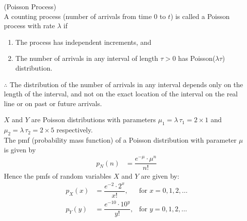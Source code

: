 \begin{definition}\label{poisson/3/poisson_process}
    (Poisson Process)\\
    A counting process (number of arrivals from time $0$ to $t$) is called a Poisson process with rate $\lambda$ if
    \begin{enumerate}[label=(\roman*)]
        \item The process has independent increments, and
        \item The number of arrivals in any interval of length $\tau > 0$ has Poisson($\lambda \tau$) distribution.
    \end{enumerate}
    $\therefore$ The distribution of the number of arrivals in any interval depends only on the length of the interval, and not on the exact location of the interval on the real line or on past or future arrivals.
    \end{definition}
    \begin{definition}
        $X$ and $Y$ are Poisson distributions with parameters $\mu_1 = \lambda \, \tau_1 = 2 \times 1$ and $\mu_2 = \lambda \, \tau_2 = 2 \times 5$ respectively. \\
        The pmf (probability mass function) of a Poisson distribution with parameter $\mu$ is given by
        \begin{align}
            p_N(n) &= \dfrac{e^{-\mu}\cdot \mu^{n}}{n!}
        \end{align}
        Hence the pmfs of random variables $X$ and $Y$ are given by:
        \begin{align}
            p_X(x) &= \dfrac{e^{-2}\cdot 2^{x}}{x!}, & \text{for } x=0,1,2,\dots \label{poisson/3/pmf(X)}\\
            p_Y(y) &= \dfrac{e^{-10}\cdot 10^{y}}{y!}, & \text{for } y=0,1,2,\dots \label{poisson/3/pmf(Y)}
        \end{align}
    \end{definition}
        
